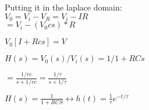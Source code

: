 Putting it in the laplace domain:\\

$V_0 = V_i - V_R = V_i - IR$ \\
$= V_i - (V_0 c s) * R$


$V_0[I + R c s] = V$

$H(s) = V_0(s) / V_i(s) = 1 / 1 + RCs$

$ = \frac{1/rc}{s + 1/rc} = \frac{1/\tau}{ s + 1/\tau}$




$H(s) 
= \frac{1}{1 + R C S} 
\leftrightarrow 
h(t) = \frac{1}{\tau}e^{-t / \tau}$

